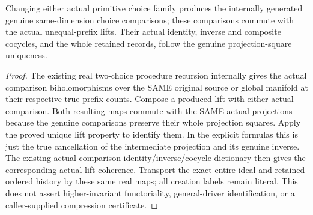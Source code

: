 \begin{theorem}
\label{hir:submersion-choice-image-trace-actual-choice-cocycle}
\leanok
{}

Changing either actual primitive choice family produces the internally generated genuine same-dimension choice comparisons; these comparisons commute with the actual unequal-prefix lifts. Their actual identity, inverse and composite cocycles, and the whole retained records, follow the genuine projection-square uniqueness.
\end{theorem}
\begin{proof}
The existing real two-choice procedure recursion internally gives the actual comparison biholomorphisms over the SAME original source or global manifold at their respective true prefix counts. Compose a produced lift with either actual comparison. Both resulting maps commute with the SAME actual projections because the genuine comparisons preserve their whole projection squares. Apply the proved unique lift property to identify them. In the explicit formulas this is just the true cancellation of the intermediate projection and its genuine inverse. The existing actual comparison identity/inverse/cocycle dictionary then gives the corresponding actual lift coherence. Transport the exact entire ideal and retained ordered history by these same real maps; all creation labels remain literal. This does not assert higher-invariant functoriality, general-driver identification, or a caller-supplied compression certificate.
\end{proof}
